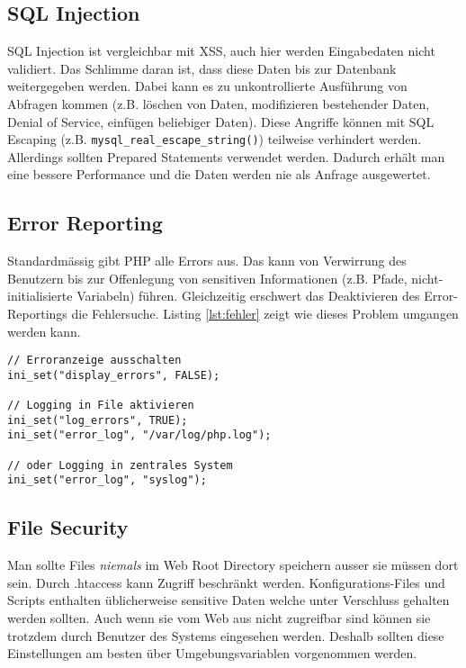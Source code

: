 \subsection{SQL Injection}

SQL Injection ist vergleichbar mit XSS, auch hier werden Eingabedaten nicht validiert. Das Schlimme daran ist, dass diese Daten bis zur Datenbank weitergegeben werden. Dabei kann es zu unkontrollierte Ausführung von Abfragen kommen (z.B. löschen von Daten, modifizieren bestehender Daten, Denial of Service, einfügen beliebiger Daten).
Diese Angriffe können mit SQL Escaping (z.B. \verb|mysql_real_escape_string()|) teilweise verhindert werden. Allerdings sollten Prepared Statements verwendet werden. Dadurch erhält man eine bessere Performance und die Daten werden nie als Anfrage ausgewertet.

\subsection{Error Reporting}

Standardmässig gibt PHP alle Errors aus. Das kann von Verwirrung des Benutzern bis zur Offenlegung von sensitiven Informationen (z.B. Pfade, nicht-initialisierte Variabeln) führen. Gleichzeitig erschwert das Deaktivieren des Error-Reportings die Fehlersuche. Listing \ref{lst:fehler}  zeigt wie dieses Problem umgangen werden kann.

\begin{lstlisting}[caption=Fehler loggen, label=lst:fehler]
// Erroranzeige ausschalten
ini_set("display_errors", FALSE);

// Logging in File aktivieren
ini_set("log_errors", TRUE);
ini_set("error_log", "/var/log/php.log");

// oder Logging in zentrales System
ini_set("error_log", "syslog");
\end{lstlisting}

\subsection{File Security}

Man sollte Files \textit{niemals} im Web Root Directory speichern ausser sie müssen dort sein. Durch .htaccess kann Zugriff beschränkt werden. Konfigurations-Files und Scripts enthalten üblicherweise sensitive Daten welche unter Verschluss gehalten werden sollten. Auch wenn sie vom Web aus nicht zugreifbar sind können sie trotzdem durch Benutzer des Systems eingesehen werden. Deshalb sollten diese Einstellungen am besten über Umgebungsvariablen vorgenommen werden.

